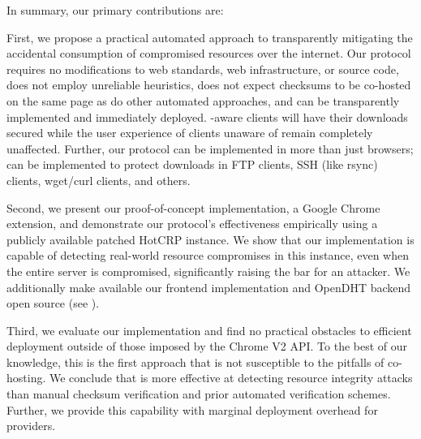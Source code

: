 In summary, our primary contributions are:

First, we propose a practical automated approach to transparently mitigating the
accidental consumption of compromised resources over the internet. Our protocol
requires no modifications to web standards, web infrastructure, or source code,
does not employ unreliable heuristics, does not expect checksums to be co-hosted
on the same page as do other automated approaches, and can be transparently
implemented and immediately deployed. \SYSTEM{}-aware clients will have their
downloads secured while the user experience of clients unaware of \SYSTEM{}
remain completely unaffected. Further, our protocol can be implemented in more
than just browsers; \SYSTEM{} can be implemented to protect downloads in FTP
clients, SSH (like rsync) clients, wget/curl clients, and others.

Second, we present our proof-of-concept implementation, a Google Chrome extension,
and demonstrate our protocol's effectiveness empirically using a publicly
available patched HotCRP instance. We show that our implementation is capable of
detecting real-world resource compromises in this instance, even when the entire
server is compromised, significantly raising the bar for an attacker. We
additionally make available our frontend implementation and OpenDHT backend open
source (see ).

Third, we evaluate our implementation and find no practical obstacles to
efficient deployment outside of those imposed by the Chrome V2 API. To the best
of our knowledge, this is the first approach that is not susceptible to the
pitfalls of co-hosting. We conclude that \SYSTEM{} is more effective at
detecting resource integrity attacks than manual checksum verification and prior
automated verification schemes. Further, we provide this capability with
marginal deployment overhead for providers.
